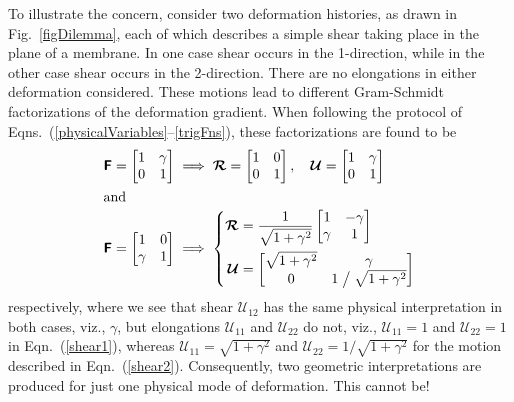 To illustrate the concern, consider two deformation histories, as drawn in Fig.~\ref{figDilemma}, each of which describes a simple shear taking place in the plane of a membrane.  In one case shear occurs in the 1-direction, while in the other case shear occurs in the 2-direction.  There are no elongations in either deformation considered.  These motions lead to different Gram-Schmidt factorizations of the deformation gradient.  When following the protocol of Eqns.~(\ref{physicalVariables}--\ref{trigFns}), these factorizations are found to be
\begin{subequations}
	\label{shears}
	\begin{align}
	\mathbfsf{F} = 
	\begin{bmatrix} 1 & \gamma \\ 0 & 1 \end{bmatrix} & \implies 
	\boldsymbol{\mathcal{R}} = 
	\begin{bmatrix} 1 & 0 \\ 0 & 1 \end{bmatrix} , \quad
	\boldsymbol{\mathcal{U}} = 
	\begin{bmatrix} 1 & \gamma \\ 0 & 1  \end{bmatrix} 
	\label{shear1} \\
	\intertext{and}
	\mathbfsf{F} = 
	\begin{bmatrix} 1 & 0 \\ \gamma & 1 \end{bmatrix} & \implies \left\{
	\begin{aligned} \mbox{}
	\boldsymbol{\mathcal{R}} & = \frac{1}{\sqrt{1 + \gamma^2}}
	\begin{bmatrix} 1 & -\gamma \\ \gamma & 1 \end{bmatrix} \\
	\boldsymbol{\mathcal{U}} & = 
	\begin{bmatrix} \sqrt{1 + \gamma^2} & \gamma \\ 
	0 & 1 \bigm/ \sqrt{1 + \gamma^2} \end{bmatrix}
	\end{aligned} \right.
	\label{shear2}
	\end{align}
\end{subequations}
respectively, where we see that shear $\mathcal{U}_{12}$ has the same physical interpretation in both cases, viz., $\gamma$, but elongations $\mathcal{U}_{11}$ and $\mathcal{U}_{22}$ do not, viz., $\mathcal{U}_{11}=1$ and $\mathcal{U}_{22}=1$ in Eqn.~(\ref{shear1}), whereas $\mathcal{U}_{11} = \sqrt{1 + \gamma^2}$ and $\mathcal{U}_{22} = 1 / \sqrt{1 + \gamma^2}$ for the motion described in Eqn.~(\ref{shear2}).  Consequently, two geometric interpretations are produced for just one physical mode of deformation.  This cannot be!

